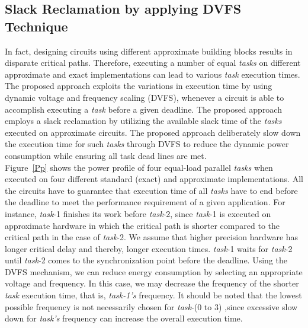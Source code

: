 \documentclass[journal]{IEEEtran}
\begin{document}
\subsection{Slack Reclamation by applying DVFS Technique}
\hfill \break
In fact, designing circuits using different approximate building blocks results in disparate critical paths. Therefore, executing a number of equal \emph{tasks} on different approximate and exact implementations can lead to various \emph{task} execution times. The proposed approach exploits the variations in execution time by using dynamic voltage and frequency scaling (DVFS), whenever a circuit is able to accomplish executing a \emph{task} before a given deadline. The proposed approach employs a slack reclamation by utilizing the available slack time of the \emph{tasks} executed on approximate circuits. The proposed approach deliberately slow down the execution time for such \emph{tasks} through DVFS to reduce the dynamic power consumption while ensuring all task dead lines are met.     \\
Figure~\ref{Pp} shows the power profile of four equal-load parallel \emph{tasks} when executed on four different standard (exact) and approximate implementations. All the circuits have to guarantee that execution time of all \emph{tasks} have to end before the deadline to meet the performance requirement of a given application. For instance, \emph{task}-1 finishes its work before \emph{task}-2, since \emph{task}-1 is executed on approximate hardware in which the critical path is shorter compared to the critical path in the case of \emph{task}-2. We assume that higher precision hardware has longer critical delay and thereby, longer execution times. \emph{task}-1 waits for \emph{task}-2 until \emph{task}-2 comes to the synchronization point before the deadline. Using the DVFS mechanism, we can reduce energy consumption by selecting an appropriate voltage and frequency. In this case, we may decrease the frequency of the shorter \emph{task} execution time, that is, \emph{task-1's} frequency. It should be noted that the lowest possible frequency is not necessarily chosen for \emph{task}-(0 to 3) ,since excessive slow down for \emph{task's} frequency can increase the overall execution time.\\
\end{document}
